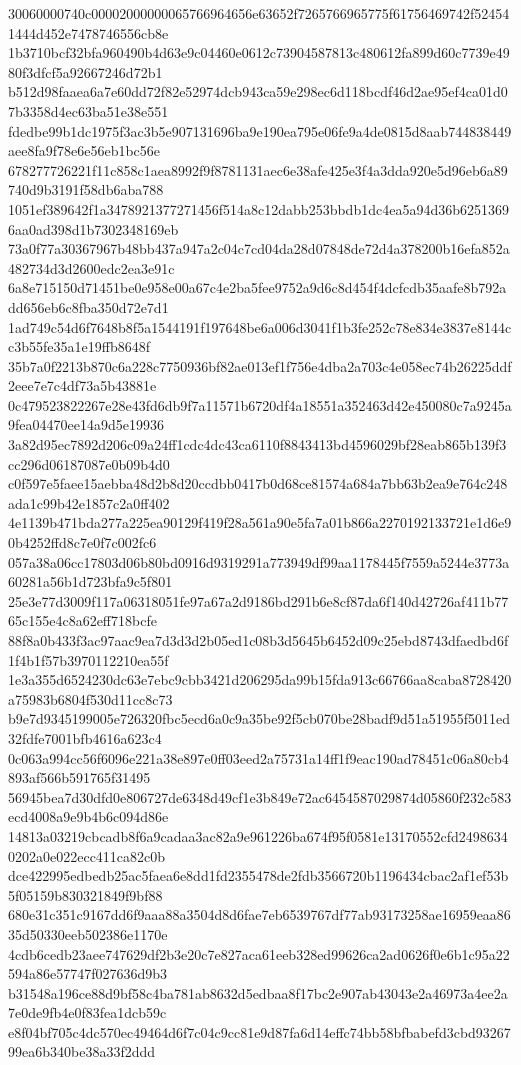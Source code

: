 {30060000740c00002000000065766964656e63652f7265766965775f61756469742f524541444d452e7478746556cb8e
1b3710bcf32bfa960490b4d63e9c04460e0612c73904587813c480612fa899d60c7739e4980f3dfcf5a92667246d72b1
b512d98faaea6a7e60dd72f82e52974dcb943ca59e298ec6d118bcdf46d2ae95ef4ca01d07b3358d4ec63ba51e38e551
fdedbe99b1dc1975f3ac3b5e907131696ba9e190ea795e06fe9a4de0815d8aab744838449aee8fa9f78e6e56eb1bc56e
678277726221f11c858c1aea8992f9f8781131aec6e38afe425e3f4a3dda920e5d96eb6a89740d9b3191f58db6aba788
1051ef389642f1a3478921377271456f514a8c12dabb253bbdb1dc4ea5a94d36b62513696aa0ad398d1b7302348169eb
73a0f77a30367967b48bb437a947a2c04c7cd04da28d07848de72d4a378200b16efa852a482734d3d2600edc2ea3e91c
6a8e715150d71451be0e958e00a67c4e2ba5fee9752a9d6c8d454f4dcfcdb35aafe8b792add656eb6c8fba350d72e7d1
1ad749c54d6f7648b8f5a1544191f197648be6a006d3041f1b3fe252c78e834e3837e8144cc3b55fe35a1e19ffb8648f
35b7a0f2213b870c6a228c7750936bf82ae013ef1f756e4dba2a703c4e058ec74b26225ddf2eee7e7c4df73a5b43881e
0c479523822267e28e43fd6db9f7a11571b6720df4a18551a352463d42e450080c7a9245a9fea04470ee14a9d5e19936
3a82d95ec7892d206c09a24ff1cdc4dc43ca6110f8843413bd4596029bf28eab865b139f3cc296d06187087e0b09b4d0
c0f597e5faee15aebba48d2b8d20ccdbb0417b0d68ce81574a684a7bb63b2ea9e764c248ada1c99b42e1857c2a0ff402
4e1139b471bda277a225ea90129f419f28a561a90e5fa7a01b866a2270192133721e1d6e90b4252ffd8c7e0f7c002fc6
057a38a06cc17803d06b80bd0916d9319291a773949df99aa1178445f7559a5244e3773a60281a56b1d723bfa9c5f801
25e3e77d3009f117a06318051fe97a67a2d9186bd291b6e8cf87da6f140d42726af411b7765c155e4c8a62eff718bcfe
88f8a0b433f3ac97aac9ea7d3d3d2b05ed1c08b3d5645b6452d09c25ebd8743dfaedbd6f1f4b1f57b3970112210ea55f
1e3a355d6524230dc63e7ebc9cbb3421d206295da99b15fda913c66766aa8caba8728420a75983b6804f530d11cc8c73
b9e7d9345199005e726320fbc5ecd6a0c9a35be92f5cb070be28badf9d51a51955f5011ed32fdfe7001bfb4616a623c4
0c063a994cc56f6096e221a38e897e0ff03eed2a75731a14ff1f9eac190ad78451c06a80cb4893af566b591765f31495
56945bea7d30dfd0e806727de6348d49cf1e3b849e72ac6454587029874d05860f232c583ecd4008a9e9b4b6c094d86e
14813a03219cbcadb8f6a9cadaa3ac82a9e961226ba674f95f0581e13170552cfd24986340202a0e022ecc411ca82c0b
dce422995edbedb25ac5faea6e8dd1fd2355478de2fdb3566720b1196434cbac2af1ef53b5f05159b830321849f9bf88
680e31c351c9167dd6f9aaa88a3504d8d6fae7eb6539767df77ab93173258ae16959eaa8635d50330eeb502386e1170e
4cdb6cedb23aee747629df2b3e20c7e827aca61eeb328ed99626ca2ad0626f0e6b1c95a22594a86e57747f027636d9b3
b31548a196ce88d9bf58c4ba781ab8632d5edbaa8f17bc2e907ab43043e2a46973a4ee2a7e0de9fb4e0f83fea1dcb59c
e8f04bf705c4dc570ec49464d6f7c04c9cc81e9d87fa6d14effc74bb58bfbabefd3cbd9326799ea6b340be38a33f2ddd
}
